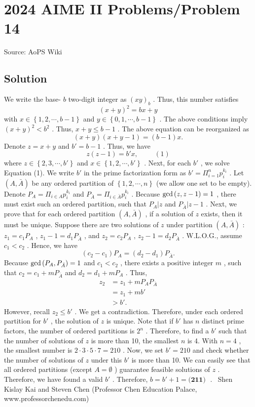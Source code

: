 \documentclass[12pt]{article}
\begin{document}
\section*{{2024 AIME II Problems/Problem 14}}
Source: AoPS Wiki

\subsection*{Solution}
We write the base- $b$ two-digit integer as $\left( xy \right)_b$ .
Thus, this number satisfies \[ \left( x + y \right)^2 = b x + y \] with $x \in \left\{ 1, 2, \cdots , b-1 \right\}$ and $y \in \left\{ 0, 1, \cdots , b - 1 \right\}$ . The above conditions imply $\left( x + y \right)^2 < b^2$ . Thus, $x + y \leq b - 1$ . The above equation can be reorganized as \[ \left( x + y \right) \left( x + y - 1 \right) = \left( b - 1 \right) x . \] Denote $z = x + y$ and $b' = b - 1$ .
Thus, we have \[ z \left( z - 1 \right) = b' x , \hspace{1cm} (1) \] where $z \in \left\{ 2, 3, \cdots , b' \right\}$ and $x \in \left\{ 1, 2, \cdots , b' \right\}$ . Next, for each $b'$ , we solve Equation (1). We write $b'$ in the prime factorization form as $b' = \Pi_{i=1}^n p_i^{k_i}$ .
Let $\left(A, \bar A \right)$ be any ordered partition of $\left\{ 1, 2, \cdots , n \right\}$ (we allow one set to be empty).
Denote $P_A = \Pi_{i \in A} p_i^{k_i}$ and $P_{\bar A} = \Pi_{i \in \bar A} p_i^{k_i}$ . Because ${\rm gcd} \left( z, z-1 \right) = 1$ , there must exist such an ordered partition, such that $P_A | z$ and $P_{\bar A} | z-1$ . Next, we prove that for each ordered partition $\left( A, \bar A \right)$ , if a solution of $z$ exists, then it must be unique. Suppose there are two solutions of $z$ under partition $\left( A, \bar A \right)$ : $z_1 = c_1 P_A$ , $z_1 - 1 = d_1 P_{\bar A}$ , and $z_2 = c_2 P_A$ , $z_2 - 1 = d_2 P_{\bar A}$ .
W.L.O.G., assume $c_1 < c_2$ .
Hence, we have \[ \left( c_2 - c_1 \right) P_A = \left( d_2 - d_1 \right) P_{\bar A} . \] Because ${\rm gcd} \left( P_A, P_{\bar A} \right) = 1$ and $c_1 < c_2$ , there exists a positive integer $m$ , such that $c_2 = c_1 + m P_{\bar A}$ and $d_2 = d_1 + m P_A$ .
Thus,
\begin{align*}
z_2 & = z_1 + m P_A P_{\bar A} \\
& = z_1 + m b' \\
& > b' .
\end{align*} However, recall $z_2 \leq b'$ . We get a contradiction.
Therefore, under each ordered partition for $b'$ , the solution of $z$ is unique. Note that if $b'$ has $n$ distinct prime factors, the number of ordered partitions is $2^n$ .
Therefore, to find a $b'$ such that the number of solutions of $z$ is more than 10, the smallest $n$ is 4. With $n = 4$ , the smallest number is $2 \cdot 3 \cdot 5 \cdot 7 = 210$ .
Now, we set $b' = 210$ and check whether the number of solutions of $z$ under this $b'$ is more than 10. We can easily see that all ordered partitions (except $A = \emptyset$ ) guarantee feasible solutions of $z$ .
Therefore, we have found a valid $b'$ .
Therefore, $b = b' + 1 = \boxed{\textbf{(211) }}$ . ~Shen Kislay Kai and Steven Chen (Professor Chen Education Palace, www.professorchenedu.com)
\end{document}
